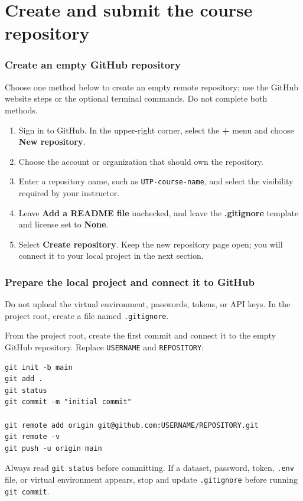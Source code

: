 \chapter{Create and submit the course repository}
\label{ch:repo-submission}

\subsection{Create an empty GitHub repository}

Choose one method below to create an empty remote repository: use the GitHub website steps or the optional terminal commands. Do not complete both methods.

\begin{enumerate}[leftmargin=1.7em,itemsep=0.35em,topsep=0.4em]
  \item Sign in to GitHub. In the upper-right corner, select the \textbf{+} menu and choose \textbf{New repository}.
  \item Choose the account or organization that should own the repository.
  \item Enter a repository name, such as \texttt{UTP-course-name}, and select the visibility required by your instructor.
  \item Leave \textbf{Add a README file} unchecked, and leave the \textbf{.gitignore} template and license set to \textbf{None}.
  \item Select \textbf{Create repository}. Keep the new repository page open; you will connect it to your local project in the next section.
\end{enumerate}

\subsection{Prepare the local project and connect it to GitHub}

Do not upload the virtual environment, passwords, tokens, or API keys. In the project root, create a file named \texttt{.gitignore}.

From the project root, create the first commit and connect it to the empty
GitHub repository. Replace \texttt{USERNAME} and \texttt{REPOSITORY}:

\begin{lstlisting}[style=utpterminal]
git init -b main
git add .
git status
git commit -m "initial commit"

git remote add origin git@github.com:USERNAME/REPOSITORY.git
git remote -v
git push -u origin main
\end{lstlisting}

\begin{pitfall}
Always read \texttt{git status} before committing. If a dataset, password,
token, \texttt{.env} file, or virtual environment appears, stop and update
\texttt{.gitignore} before running \texttt{git commit}.
\end{pitfall}